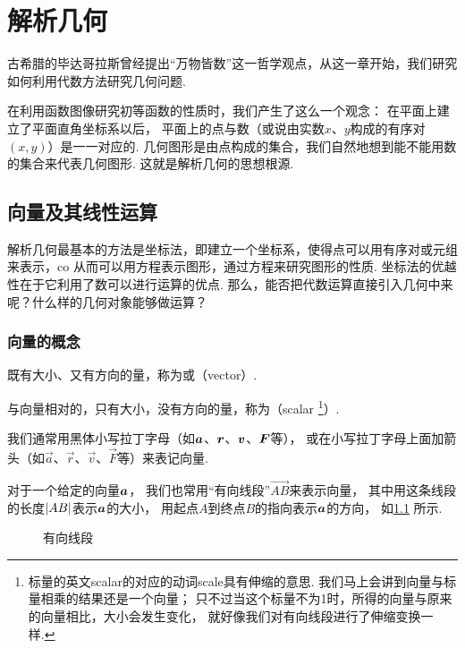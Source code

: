 \chapter{解析几何}
古希腊的毕达哥拉斯曾经提出“万物皆数”这一哲学观点，从这一章开始，我们研究如何利用代数方法研究几何问题.

在利用函数图像研究初等函数的性质时，我们产生了这么一个观念：
在平面上建立了平面直角坐标系以后，%
平面上的点与数（或说由实数\(x\)、\(y\)构成的有序对\((x,y)\)）是一一对应的.
几何图形是由点构成的集合，我们自然地想到能不能用数的集合来代表几何图形.
这就是解析几何的思想根源.


\section{向量及其线性运算}
解析几何最基本的方法是坐标法，即建立一个坐标系，使得点可以用有序对或元组来表示，co
从而可以用方程表示图形，通过方程来研究图形的性质.
坐标法的优越性在于它利用了数可以进行运算的优点.
那么，能否把代数运算直接引入几何中来呢？什么样的几何对象能够做运算？

\subsection{向量的概念}
\begin{definition}
既有大小、又有方向的量，称为或（vector）.

与向量相对的，只有大小，没有方向的量，称为（scalar
\footnote{标量的英文scalar的对应的动词scale具有伸缩的意思.
我们马上会讲到向量与标量相乘的结果还是一个向量；
只不过当这个标量不为1时，所得的向量与原来的向量相比，大小会发生变化，
就好像我们对有向线段进行了伸缩变换一样.}）.
\end{definition}

我们通常用黑体小写拉丁字母（如\(\boldsymbol{a}\)、\(\boldsymbol{r}\)、\(\boldsymbol{v}\)、\(\boldsymbol{F}\)等），
或在小写拉丁字母上面加箭头（如\(\vec{a}\)、\(\vec{r}\)、\(\vec{v}\)、\(\vec{F}\)等）来表记向量.

对于一个给定的向量\(\boldsymbol{a}\)，
我们也常用“有向线段”\(\vec{AB}\)来表示向量，
其中用这条线段的长度\(\abs{AB}\)表示\(\boldsymbol{a}\)的大小，
用起点\(A\)到终点\(B\)的指向表示\(\boldsymbol{a}\)的方向，
如\cref{figure:解析几何.有向线段} 所示.
\begin{figure}[ht]
\centering
{}
\caption{有向线段}
\label{figure:解析几何.有向线段}
\end{figure}

